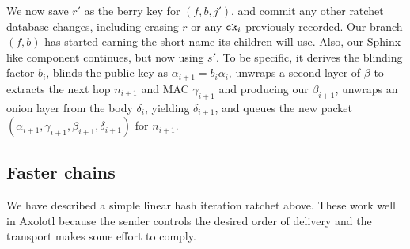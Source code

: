 \documentclass[twoside,letterpaper]{llncs}
\begin{document}
We now save $r'$ as the berry key for $(f,b,j')$, and commit any
other ratchet database changes, including erasing $r$ or any 
$\texttt{ck}_i$ previously recorded.  Our branch $(f,b)$ has started
earning the short name its children will use.  
Also, our Sphinx-like component continues, but now using $s'$.
To be specific, it derives the blinding factor $b_i$,
blinds the public key as $\alpha_{i+1} = b_i \alpha_i$,
unwraps a second layer of $\beta$ to extracts the
 next hop $n_{i+1}$ and MAC $\gamma_{i+1}$ and 
 producing our $\beta_{i+1}$,
unwraps an onion layer from the body $\delta_i$,
 yielding $\delta_{i+1}$, and queues the new packet
$(\alpha_{i+1},\gamma_{i+1},\beta_{i+1},\delta_{i+1})$ for $n_{i+1}$.

 \begin{figure}[b!]%
   \begin{center}
\end{center}
\end{figure}


\subsection{Faster chains}

We have described a simple linear hash iteration ratchet above.  
These work well in Axolotl because the sender controls the desired
order of delivery and the transport makes some effort to comply.
\end{document}
